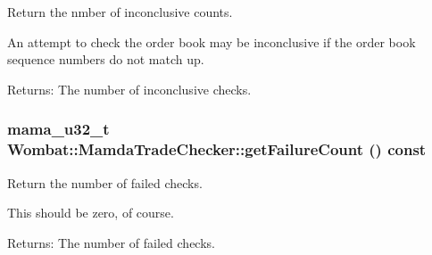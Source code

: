 Return the nmber of inconclusive counts. 

An attempt to check the order book may be inconclusive if the order book sequence numbers do not match up.

\begin{Desc}
\item[Returns:]The number of inconclusive checks. \end{Desc}
\hypertarget{classWombat_1_1MamdaTradeChecker_04d7890044b0731514743f646e7cdb02}{
\subsubsection[getFailureCount]{\setlength{\rightskip}{0pt plus 5cm}mama\_\-u32\_\-t Wombat::Mamda\-Trade\-Checker::get\-Failure\-Count () const}}
\label{classWombat_1_1MamdaTradeChecker_04d7890044b0731514743f646e7cdb02}


Return the number of failed checks. 

This should be zero, of course.

\begin{Desc}
\item[Returns:]The number of failed checks. \end{Desc}
